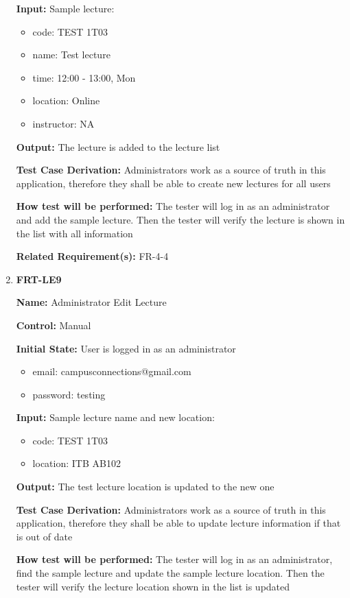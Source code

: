 \documentclass[12pt, titlepage]{article}
\begin{document}
\begin{enumerate}
\textbf{Input:} Sample lecture:
\begin{itemize}
\item code: TEST 1T03
\item name: Test lecture
\item time: 12:00 - 13:00, Mon
\item location: Online
\item instructor: NA
\end{itemize}
					
\textbf{Output:} The lecture is added to the lecture list

\textbf{Test Case Derivation:} Administrators work as a source of truth in this application, therefore they shall be able to create new lectures for all users
					
\textbf{How test will be performed:} The tester will log in as an administrator and add the sample lecture. Then the tester will verify the lecture is shown in the list with all information

\textbf{Related Requirement(s):} FR-4-4

\item{\textbf{FRT-LE9}}

\textbf{Name:} Administrator Edit Lecture

\textbf{Control:} Manual
					
\textbf{Initial State:} User is logged in as an administrator
\begin{itemize}
\item email: campusconnections@gmail.com
\item password: testing
\end{itemize}

\textbf{Input:} Sample lecture name and new location:
\begin{itemize}
\item code: TEST 1T03
\item location: ITB AB102
\end{itemize}
					
\textbf{Output:} The test lecture location is updated to the new one

\textbf{Test Case Derivation:} Administrators work as a source of truth in this application, therefore they shall be able to update lecture information if that is out of date
					
\textbf{How test will be performed:} The tester will log in as an administrator, find the sample lecture and update the sample lecture location. Then the tester will verify the lecture location shown in the list is updated


\end{enumerate}
\end{document}
